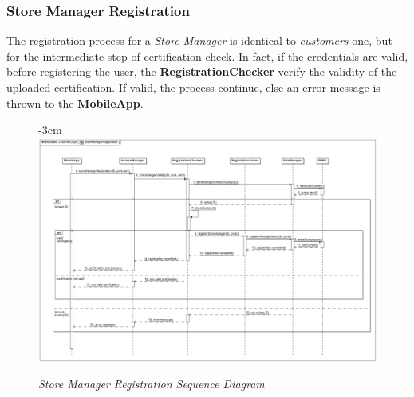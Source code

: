 \documentclass{article}
\begin{document}
	\subsubsection{Store Manager Registration}
	The registration process for a \emph{Store Manager} is identical to \emph{customers} one, but for the intermediate step of certification check. In fact, if the credentials are valid, before registering the user, the {\bfseries RegistrationChecker} verify the validity of the uploaded certification. If valid, the process continue, else an error message is thrown to the {\bfseries MobileApp}.
	\begin{figure}[H]
		\begin{adjustwidth} {-3cm}{}
			\centering
			\includegraphics[scale=0.4]{Sequence Diagrams/sd__CustomerLogin__StoreManagerRegistration.png}
		\end{adjustwidth}
		\caption{\emph{Store Manager Registration Sequence Diagram}}
	\end{figure}
	
\end{document}
